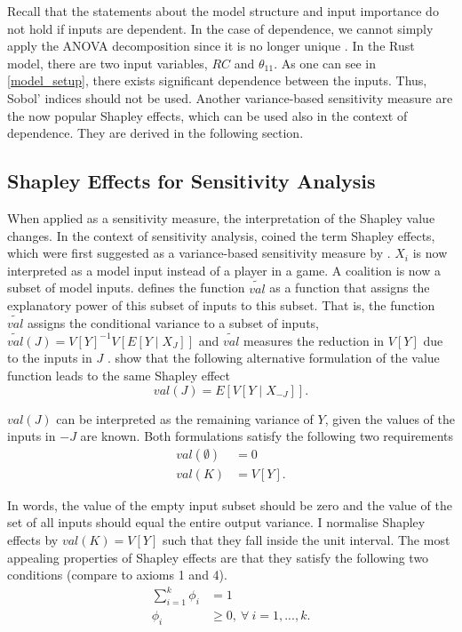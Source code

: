 Recall that the statements about the model structure and input importance do not hold if inputs are dependent. In the case of dependence, we cannot simply apply the ANOVA decomposition since it is no longer unique \citep{O14}. In the Rust model, there are two input variables, $RC$ and $\theta_{11}$. As one can see in \cref{model_setup}, there exists significant dependence between the inputs. Thus, Sobol' indices should not be used. Another variance-based sensitivity measure are the now popular Shapley effects, which can be used also in the context of dependence. They are derived in the following section.

\subsection{Shapley Effects for Sensitivity Analysis}

When applied as a sensitivity measure, the interpretation of the Shapley value changes. In the context of sensitivity analysis, \citet{SNS16} coined the term Shapley effects, which were first suggested as a variance-based sensitivity measure by \citet{O14}. $X_i$ is now interpreted as a model input instead of a player in a game. A coalition is now a subset of model inputs. \citet{O14} defines the function $\widetilde{val}$ as a function that assigns the explanatory power of this subset of inputs to this subset. That is, the function $\widetilde{val}$ assigns the conditional variance to a subset of inputs, $\widetilde{val}(J)=V[Y]^{-1}V[E[Y \mid X_J]]$ and $\widetilde{val}$ measures the reduction in $V[Y]$ due to the inputs in $J$ \citep{SNS16}. \citet{SNS16} show that the following alternative formulation of the value function leads to the same Shapley effect
\begin{equation*}
val(J)=E[V[Y \mid X_{- J}]].
\end{equation*}

\noindent $val(J)$ can be interpreted as the remaining variance of $Y$, given the values of the inputs in $- J$ are known. Both formulations satisfy the following two requirements
\begin{align*}
val(\emptyset)& = 0\\
val(K)& = V[Y].
\end{align*}

\noindent In words, the value of the empty input subset should be zero and the value of the set of all inputs should equal the entire output variance. I normalise Shapley effects by $val(K)=V[Y] $ such that they fall inside the unit interval. The most appealing properties of Shapley effects are that they satisfy the following two conditions (compare to axioms 1 and 4).
\begin{align*}
\sum_{i=1}^{k}\phi_i& = 1\\
\phi_i& \geq 0,\ \forall \ i=1, ..., k.
\end{align*}

